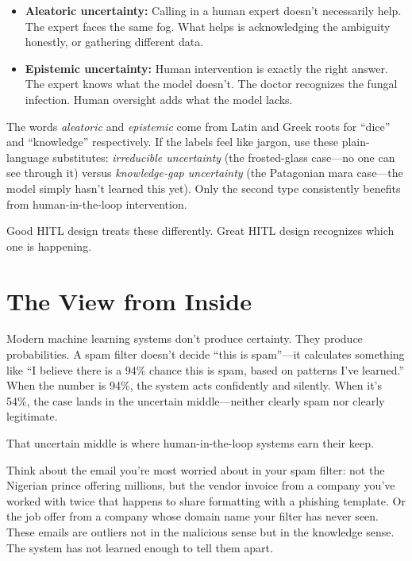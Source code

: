 \begin{examplebox}
\begin{itemize}
    \item \textbf{Aleatoric uncertainty:} Calling in a human expert doesn't necessarily help. The expert faces the same fog. What helps is acknowledging the ambiguity honestly, or gathering different data.
    \item \textbf{Epistemic uncertainty:} Human intervention is exactly the right answer. The expert knows what the model doesn't. The doctor recognizes the fungal infection. Human oversight adds what the model lacks.
\end{itemize}
\end{examplebox}

\begin{technote}
The words \emph{aleatoric} and \emph{epistemic} come from Latin and Greek roots for ``dice'' and ``knowledge'' respectively. If the labels feel like jargon, use these plain-language substitutes: \emph{irreducible uncertainty} (the frosted-glass case---no one can see through it) versus \emph{knowledge-gap uncertainty} (the Patagonian mara case---the model simply hasn't learned this yet). Only the second type consistently benefits from human-in-the-loop intervention.
\end{technote}

Good HITL design treats these differently. Great HITL design recognizes which one is happening.

\section{The View from Inside}

Modern machine learning systems don't produce certainty. They produce probabilities. A spam filter doesn't decide ``this is spam''---it calculates something like ``I believe there is a 94\% chance this is spam, based on patterns I've learned.'' When the number is 94\%, the system acts confidently and silently. When it's 54\%, the case lands in the uncertain middle---neither clearly spam nor clearly legitimate.

That uncertain middle is where human-in-the-loop systems earn their keep.

Think about the email you're most worried about in your spam filter: not the Nigerian prince offering millions, but the vendor invoice from a company you've worked with twice that happens to share formatting with a phishing template. Or the job offer from a company whose domain name your filter has never seen. These emails are outliers not in the malicious sense but in the knowledge sense. The system has not learned enough to tell them apart.

